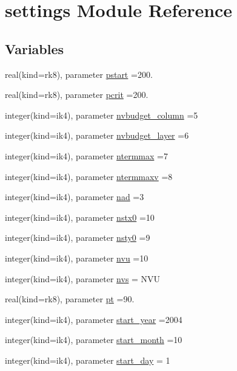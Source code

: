 \hypertarget{namespacesettings}{}\section{settings Module Reference}
\label{namespacesettings}
\subsection*{Variables}
\begin{DoxyCompactItemize}
\item 
real(kind=rk8), parameter \hyperlink{namespacesettings_a80b5ece3c388ad5e0c924f372afebe65}{pstart} =200.
\item 
real(kind=rk8), parameter \hyperlink{namespacesettings_a8d5e7d0c921e46fc4b2c7d7738729805}{pcrit} =200.
\item 
integer(kind=ik4), parameter \hyperlink{namespacesettings_a78876a80ce867f4bc71866b783b6de89}{nvbudget\+\_\+column} =5
\item 
integer(kind=ik4), parameter \hyperlink{namespacesettings_a42675226258d1641f557f9e8e756b76e}{nvbudget\+\_\+layer} =6
\item 
integer(kind=ik4), parameter \hyperlink{namespacesettings_a3e7f9f832f20c3352f6a1c901bf3d13b}{ntermmax} =7
\item 
integer(kind=ik4), parameter \hyperlink{namespacesettings_acb91032130faf4bb56bee66af8cbf573}{ntermmaxv} =8
\item 
integer(kind=ik4), parameter \hyperlink{namespacesettings_a4f624be133b88a44c8976b47b85e8eec}{nad} =3
\item 
integer(kind=ik4), parameter \hyperlink{namespacesettings_a45f66b2df6e7509477bcf669702044a8}{nstx0} =10
\item 
integer(kind=ik4), parameter \hyperlink{namespacesettings_a3989615b44f5121ea2e8761d6abc24e1}{nsty0} =9
\item 
integer(kind=ik4), parameter \hyperlink{namespacesettings_a79e2ff19d589b215ed9176906dd5cbbf}{nvu} =10
\item 
integer(kind=ik4), parameter \hyperlink{namespacesettings_ac10106479d8b3db1c5edd195b8dbf36e}{nvs} = N\+VU
\item 
real(kind=rk8), parameter \hyperlink{namespacesettings_ac94cc887999dc993bb580baf0ce85ce3}{pt} =90.
\item 
integer(kind=ik4), parameter \hyperlink{namespacesettings_a6feb18d2b9a31062fd7bc3f5533b0a4f}{start\+\_\+year} =2004
\item 
integer(kind=ik4), parameter \hyperlink{namespacesettings_a10988f9d662713f7f29e611c9b6c873d}{start\+\_\+month} =10
\item 
integer(kind=ik4), parameter \hyperlink{namespacesettings_a9d8f79c61533111bb5efd5ee1577108f}{start\+\_\+day} = 1
\end{DoxyCompactItemize}


